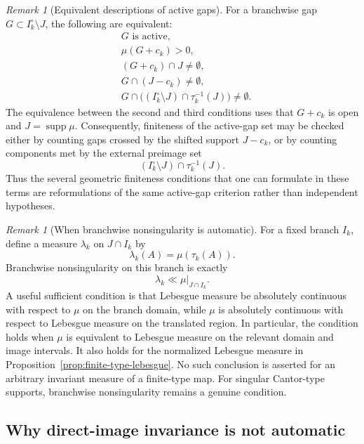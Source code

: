 \documentclass[11pt]{amsart}
\theoremstyle{plain}
\theoremstyle{definition}
\theoremstyle{remark}
\newtheorem{remark}[theorem]{Remark}
\DeclareMathOperator{\supp}{supp}
\begin{document}
\begin{remark}[Equivalent descriptions of active gaps]\label{rem:active-gap-reformulations}
For a branchwise gap \(G\subset I_k^\circ\setminus J\), the following are equivalent:
\[
\begin{aligned}
&G\text{ is active},\\
&\mu(G+c_k)>0,\\
&(G+c_k)\cap J\neq\emptyset,\\
&G\cap(J-c_k)\neq\emptyset,\\
&G\cap\bigl((I_k^\circ\setminus J)\cap\tau_k^{-1}(J)\bigr)\neq\emptyset.
\end{aligned}
\]
The equivalence between the second and third conditions uses that \(G+c_k\) is open and
\(J=\supp\mu\). Consequently, finiteness of the active-gap set may be checked either by
counting gaps crossed by the shifted support \(J-c_k\), or by counting components met by the
external preimage set
\[
        (I_k^\circ\setminus J)\cap\tau_k^{-1}(J).
\]
Thus the several geometric finiteness conditions that one can formulate in these terms are
reformulations of the same active-gap criterion rather than independent hypotheses.
\end{remark}

\begin{remark}[When branchwise nonsingularity is automatic]\label{rem:nonsingularity-automatic}
For a fixed branch \(I_k\), define a measure \(\lambda_k\) on \(J\cap I_k\) by
\[
        \lambda_k(A)=\mu(\tau_k(A)).
\]
Branchwise nonsingularity on this branch is exactly
\[
        \lambda_k\ll\mu|_{J\cap I_k}.
\]
A useful sufficient condition is that Lebesgue measure be absolutely continuous with respect
to \(\mu\) on the branch domain, while \(\mu\) is absolutely continuous with respect to
Lebesgue measure on the translated region. In particular, the condition holds when \(\mu\)
is equivalent to Lebesgue measure on the relevant domain and image intervals. It also holds
for the normalized Lebesgue measure in Proposition~\ref{prop:finite-type-lebesgue}. No such
conclusion is asserted for an arbitrary invariant measure of a finite-type map. For singular
Cantor-type supports, branchwise nonsingularity remains a genuine condition.
\end{remark}



\subsection{Why direct-image invariance is not automatic}
\label{subsec:direct-image-failure}
\end{document}
